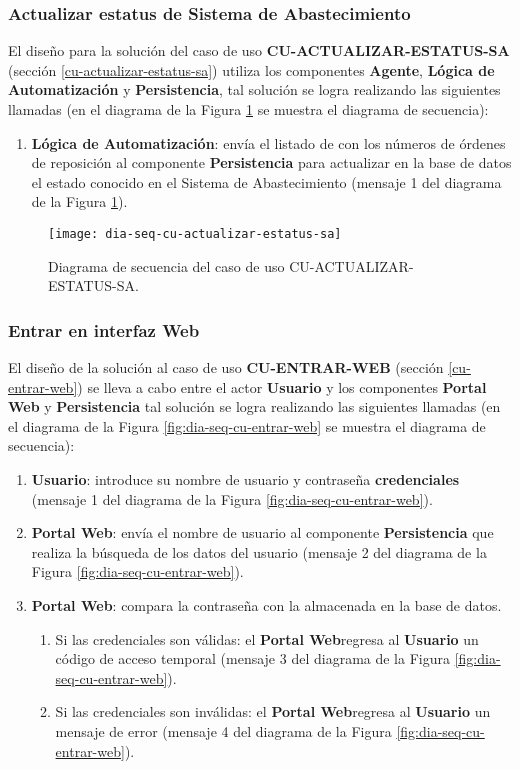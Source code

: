 \subsubsection{Actualizar estatus de Sistema de Abastecimiento}
El diseño para la solución del caso de uso \textbf{CU-ACTUALIZAR-ESTATUS-SA} (sección \ref{cu-actualizar-estatus-sa}) utiliza los componentes \textbf{Agente}, \textbf{Lógica de Automatización} y \textbf{Persistencia}, tal solución se logra realizando las siguientes llamadas (en el diagrama de la Figura \ref{fig:dia-seq-cu-actualizar-estatus-sa} se muestra el diagrama de secuencia):
\begin{enumerate}
	\item \textbf{Lógica de Automatización}: envía el listado de con los números de órdenes de reposición al componente \textbf{Persistencia} para actualizar en la base de datos el estado conocido en el Sistema de Abastecimiento (mensaje 1 del diagrama de la Figura \ref{fig:dia-seq-cu-actualizar-estatus-sa}).
\end{enumerate}

\begin{figure}[h]
	\centering
	\texttt{[image: dia-seq-cu-actualizar-estatus-sa]}
	\caption{Diagrama de secuencia del caso de uso CU-ACTUALIZAR-ESTATUS-SA.}
	\label{fig:dia-seq-cu-actualizar-estatus-sa}
\end{figure}

\subsubsection{Entrar en interfaz Web}
El diseño de la solución al caso de uso \textbf{CU-ENTRAR-WEB} (sección \ref{cu-entrar-web}) se lleva a cabo entre el actor \textbf{Usuario} y los componentes \textbf{Portal Web} y \textbf{Persistencia} tal solución se logra realizando las siguientes llamadas (en el diagrama de la Figura \ref{fig:dia-seq-cu-entrar-web} se muestra el diagrama de secuencia):
\begin{enumerate}
	\item \textbf{Usuario}: introduce su nombre de usuario y contraseña \textbf{credenciales} (mensaje 1 del diagrama de la Figura \ref{fig:dia-seq-cu-entrar-web}).
	\item \textbf{Portal Web}: envía el nombre de usuario al componente \textbf{Persistencia} que realiza la búsqueda de los datos del usuario (mensaje 2 del diagrama de la Figura \ref{fig:dia-seq-cu-entrar-web}).
	\item \textbf{Portal Web}: compara la contraseña con la almacenada en la base de datos.
	\begin{enumerate}
		\item Si las credenciales son válidas: el \textbf{Portal Web}regresa al \textbf{Usuario} un código de acceso temporal (mensaje 3 del diagrama de la Figura \ref{fig:dia-seq-cu-entrar-web}).
		\item Si las credenciales son inválidas: el \textbf{Portal Web}regresa al \textbf{Usuario} un mensaje de error (mensaje 4 del diagrama de la Figura \ref{fig:dia-seq-cu-entrar-web}).
	\end{enumerate}
\end{enumerate}

